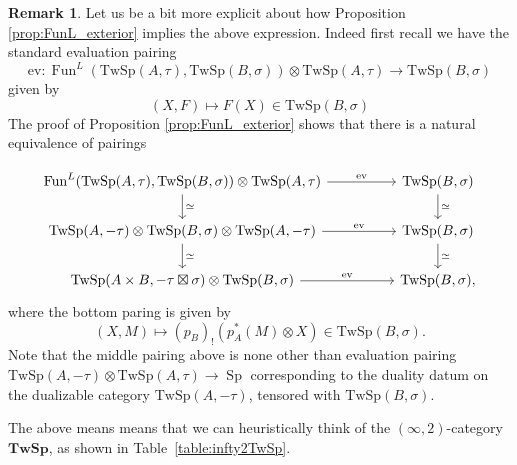 \documentclass[10pt]{amsart}
\theoremstyle{plain}
\theoremstyle{definition}
\newtheorem{rmk}[theorem]{Remark}
\DeclareMathOperator{\Sp}{Sp}
\DeclareMathOperator{\Fun}{Fun}
\newcommand{\TwSp}{\mathrm{TwSp}}
\begin{document}
\begin{rmk}
 Let us be a bit more explicit about how Proposition \ref{prop:FunL_exterior} implies the above expression. Indeed first recall we have the standard evaluation pairing
\[
\mathrm{ev}: \Fun^{L}(\TwSp(A, \tau), \TwSp(B, \sigma)) \otimes  \TwSp(A, \tau) \to \TwSp(B, \sigma)
\]
given by
\[
(X, F) \mapsto F(X) \in \TwSp(B, \sigma)
\]
The proof of Proposition \ref{prop:FunL_exterior}  shows that there is a natural equivalence of pairings

    \[
    \begin{tikzcd}[column sep = huge]
    \Fun^{L}(\TwSp(A, \tau), \TwSp(B, \sigma)) \otimes \TwSp(A, \tau) \arrow[r,"\mathrm{ev}"] \arrow[d,"\simeq"] & \TwSp(B, \sigma) \arrow[d,"\simeq"] \\
    \TwSp(A, - \tau) \otimes \TwSp(B, \sigma)  \otimes  \TwSp(A, - \tau) \arrow[r,"\mathrm{ev}"] \arrow[d,"\simeq"]  & \TwSp(B, \sigma) \arrow[d,"\simeq"] \\
    \TwSp(A \times B, - \tau \boxtimes \sigma)  \otimes \TwSp(B, \sigma)   \arrow[r,"\mathrm{ev}"]  & \TwSp(B, \sigma),
    \end{tikzcd}
    \]
where the bottom paring is given by
\[
(X, M) \mapsto (p_B)_!(p_A^*(M)\otimes X) \in   \TwSp(B, \sigma).
\]
Note that the middle pairing  above is none other than evaluation pairing $\TwSp(A, -\tau) \otimes \TwSp(A, \tau) \to \Sp $ corresponding to the duality datum on the dualizable category $\TwSp(A, -\tau)$, tensored with $\TwSp(B, \sigma)$.
\end{rmk}


The above means means that we can heuristically think of the $(\infty,2)$-category $\mathbf{TwSp}$, as shown in Table~\ref{table:infty2TwSp}.
\end{document}
